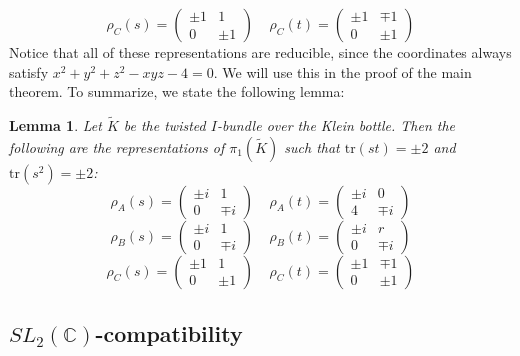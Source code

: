\documentclass{article}
\theoremstyle{plain}
\theoremstyle{definition}
\theoremstyle{plain}
\theoremstyle{plain}
\theoremstyle{plain}
\newtheorem{lemma}[theorem]{Lemma}
\theoremstyle{remark}
\theoremstyle{remark}
\theoremstyle{plain}
\theoremstyle{plain}
\begin{document}
\begin{equation}
	\rho_C(s) = \begin{pmatrix}\pm1&1\\0&\pm1\end{pmatrix} \ \ \ \ \ \rho_C(t) = \begin{pmatrix}\pm1&\mp1\\0&\pm 1\end{pmatrix}
\end{equation}
Notice that all of these representations are reducible, since the coordinates always satisfy $x^2 + y^2 + z^2 - xyz - 4 = 0$. We will use this in the proof of the main theorem. To summarize, we state the following lemma:

\begin{lemma}\label{lma:twistedbundle}
Let $\tilde{K}$ be the twisted $I$-bundle over the Klein bottle. Then the following are the representations of $\pi_1(\tilde{K})$ such that $\text{tr}(st) = \pm 2$ and $\text{tr}(s^2) = \pm 2$:
\begin{equation}
	\rho_A(s) = \begin{pmatrix}\pm i&1\\0&\mp i\end{pmatrix} \ \ \ \ \ \rho_A(t) = \begin{pmatrix}\pm i&0\\4&\mp i\end{pmatrix}
\end{equation}
\begin{equation}
	\rho_B(s) = \begin{pmatrix}\pm i&1\\0&\mp i\end{pmatrix} \ \ \ \ \ \rho_B(t) = \begin{pmatrix}\pm i&r\\0&\mp i\end{pmatrix}
\end{equation}
\begin{equation}
	\rho_C(s) = \begin{pmatrix}\pm1&1\\0&\pm1\end{pmatrix} \ \ \ \ \ \rho_C(t) = \begin{pmatrix}\pm1&\mp1\\0&\pm 1\end{pmatrix}
\end{equation}
\end{lemma}

\subsection{$SL_2(\mathbb{C})$-compatibility}
\end{document}
